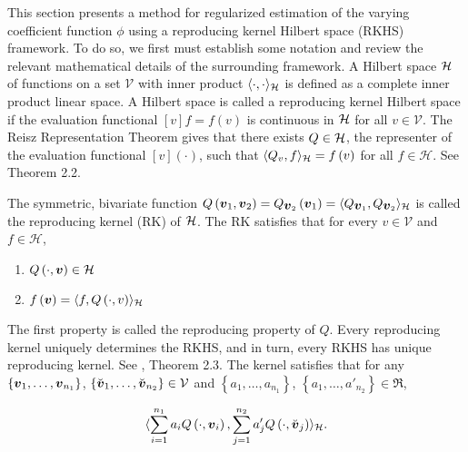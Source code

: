 This section presents a method for regularized estimation of the varying coefficient function $\phi$ using a reproducing kernel Hilbert space (RKHS) framework. To do so, we first must establish some notation and review the relevant mathematical details of the surrounding framework. A Hilbert space $\mathcal{H}$ of functions on a set $\mathcal{V}$ with inner product $\langle \cdot, \cdot\rangle_{\mathcal{H}}$ is defined as a complete inner product linear space. A Hilbert space is called a reproducing kernel Hilbert space if the evaluation functional $\left[v\right]f = f\left(v\right)$ is continuous in $\mathcal{H}$ for all $v \in \mathcal{V}$. The Reisz Representation Theorem gives that there exists $Q \in \mathcal{H}$, the representer of the evaluation functional $\left[v\right]\left(\cdot\right)$, such that $\langle Q_v, f \rangle_{\mathcal{H}} = f\left(v\right)$ for all $f \in \mathcal{H}$. See \citet{gu2013smoothing} Theorem 2.2.

\bigskip

The symmetric, bivariate function $Q\left(\mbox{\boldmath $v$}_1, \mbox{\boldmath $v$}_2 \right) = Q_{\mbox{\boldmath $v$}_2 }\left(\mbox{\boldmath $v$}_1\right) = \langle Q_{\mbox{\boldmath $v$}_1}, Q_{\mbox{\boldmath $v$}_2} \rangle_{\mathcal{H}}$ is called the reproducing kernel (RK) of $\mathcal{H}$. The RK satisfies that for every $v \in \mathcal{V}$ and $f \in \mathcal{H}$,

\begin{enumerate}
\item $Q\left(\cdot, \mbox{\boldmath $v$} \right) \in \mathcal{H}$ 
\item $f\left(\mbox{\boldmath $v$}\right) = \langle f, Q\left(\cdot, v\right)\rangle_{\mathcal{H}}$\label{rkhs-reproducing-property}
\end{enumerate}
\noindent
The first property is called the reproducing property of $Q$. Every reproducing kernel uniquely determines the RKHS, and in turn, every RKHS has unique reproducing kernel. See \citet{gu2013smoothing}, Theorem 2.3. The kernel satisfies that for any $\left\{\mbox{\boldmath $v$}_1,\dots, \mbox{\boldmath $v$}_{n_1}\right\}$, $\left\{\breve{\mbox{\boldmath $v$}}_1,\dots, \breve{\mbox{\boldmath $v$}}_{n_2}\right\} \in \mathcal{V}$ and $\left\{a_1,\dots, a_{n_1}\right\}$, $\left\{a_1,\dots, a'_{n_2}\right\} \in \Re$,

\begin{equation}
 \langle\sum_{i = 1}^{n_1} a_i Q\left(\cdot, \mbox{\boldmath $v$}_i\right), \sum_{j = 1}^{n_2} a'_j Q\left(\cdot, \breve{\mbox{\boldmath $v$}}_j\right) \rangle_{\mathcal{H}}.
\end{equation}

\bigskip




